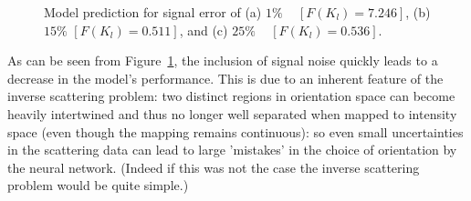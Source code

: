 \documentclass[final,  3p]{elsarticle}
\begin{document}
\begin{figure}[h]
\begin{subfigure}{0.32\textwidth}
	\end{subfigure}
	\caption{Model prediction for signal error of (a) $1\%$ ~  $[F(K_l)=7.246]$, (b) $15\%$ $[F(K_l)=0.511]$, and (c) $25\%$ ~  $[F(K_l)=0.536]$.}
	\label{fig:epsilon}
\end{figure}

As can be seen from Figure~\ref{fig:epsilon}, the inclusion of signal noise quickly leads to a decrease in the model's performance. This is due to an inherent feature of the inverse scattering problem: two distinct regions in orientation space can become heavily intertwined and thus no longer well separated when mapped to intensity space (even though the mapping remains continuous): so even small uncertainties in the scattering data can lead to large 'mistakes' in the choice of orientation by the neural network. (Indeed if this was not the case the inverse scattering problem would be quite simple.) 
\end{document}
